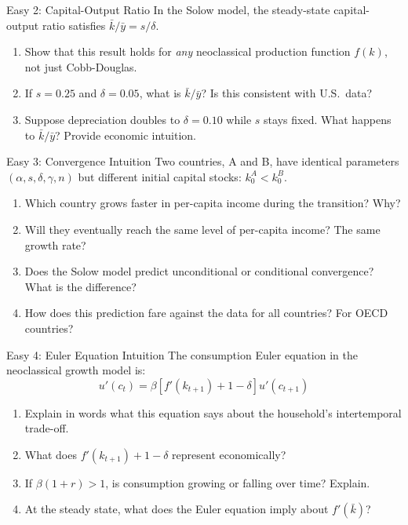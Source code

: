 \documentclass[aspectratio=169,10pt]{beamer}
\newcommand{\apxbutton}[1]{\hfill\hyperlink{#1}{\beamerbutton{Solution}}}
\begin{document}
\begin{frame}{Easy 2: Capital-Output Ratio}
\hypertarget{q-e2}{}
In the Solow model, the steady-state capital-output ratio satisfies $\bar{k}/\bar{y} = s/\delta$.

\begin{enumerate}
  \item Show that this result holds for \emph{any} neoclassical production function $f(k)$, not just Cobb-Douglas.
  \item If $s = 0.25$ and $\delta = 0.05$, what is $\bar{k}/\bar{y}$? Is this consistent with U.S.\ data?
  \item Suppose depreciation doubles to $\delta = 0.10$ while $s$ stays fixed. What happens to $\bar{k}/\bar{y}$? Provide economic intuition.
\end{enumerate}
\apxbutton{s-e2}
\end{frame}

\begin{frame}{Easy 3: Convergence Intuition}
\hypertarget{q-e3}{}
Two countries, A and B, have identical parameters $(\alpha, s, \delta, \gamma, n)$ but different initial capital stocks: $k_0^A < k_0^B$.

\begin{enumerate}
  \item Which country grows faster in per-capita income during the transition? Why?
  \item Will they eventually reach the same level of per-capita income? The same growth rate?
  \item Does the Solow model predict unconditional or conditional convergence? What is the difference?
  \item How does this prediction fare against the data for all countries? For OECD countries?
\end{enumerate}
\apxbutton{s-e3}
\end{frame}

\begin{frame}{Easy 4: Euler Equation Intuition}
\hypertarget{q-e4}{}
The consumption Euler equation in the neoclassical growth model is:
\[
u'(c_t) = \beta\left[f'(k_{t+1}) + 1 - \delta\right] u'(c_{t+1})
\]

\begin{enumerate}
  \item Explain in words what this equation says about the household's intertemporal trade-off.
  \item What does $f'(k_{t+1}) + 1 - \delta$ represent economically?
  \item If $\beta(1+r) > 1$, is consumption growing or falling over time? Explain.
  \item At the steady state, what does the Euler equation imply about $f'(\bar{k})$?
\end{enumerate}
\apxbutton{s-e4}
\end{frame}
\end{document}
